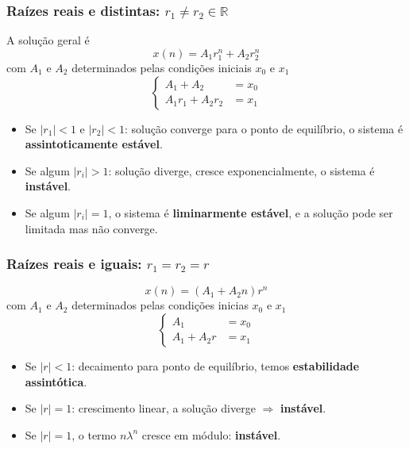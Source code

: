 \documentclass{article}
\begin{document}
\subsubsection{Raízes reais e distintas: $r_1 \neq r_2 \in \mathbb{R}$}
A solução geral é 
\begin{equation*}
  x(n) = A_1 r_1^n + A_2 r_2^n
\end{equation*}
com $A_1$ e $A_2$ determinados pelas condições iniciais $x_0$ e $x_1$
\begin{equation}
  \begin{cases}
    A_1 +A_2 &= x_0 \\
    A_1r_1 +A_2r_2 &= x_1 
  \end{cases}\label{eq:iniciais}
\end{equation}

\begin{itemize}
\item Se $|r_1| < 1$ e $|r_2| < 1$: solução  converge para o ponto de equilíbrio, o sistema é  \textbf{assintoticamente estável}.
\item Se algum $|r_i| > 1$: solução diverge,  cresce exponencialmente,  o sistema é \textbf{instável}.
\item Se algum $|r_i| = 1$, o sistema é \textbf{liminarmente estável}, e a solução pode ser limitada mas não converge.
\end{itemize}

\subsubsection{Raízes reais e iguais: $r_1 = r_2 = r$}
\begin{equation*}
  x(n) = (A_1 + A_2 n) r^n
\end{equation*}
com $A_1$ e $A_2$ determinados pelas condições inicias $x_0$ e $x_1$
\begin{equation}
  \begin{cases}
    A_1  &= x_0 \\
    A_1  + A_2 r &= x_1 
  \end{cases}
\end{equation}

\begin{itemize}
\item Se $|r| < 1$: decaimento para ponto de equilíbrio, temos \textbf{estabilidade assintótica}.
\item Se $|r| = 1$: crescimento linear, a solução diverge $\Rightarrow$ \textbf{instável}.
\item Se $|r| = 1$, o termo $n \lambda^n$ cresce em módulo: \textbf{instável}.
\end{itemize}
\end{document}
